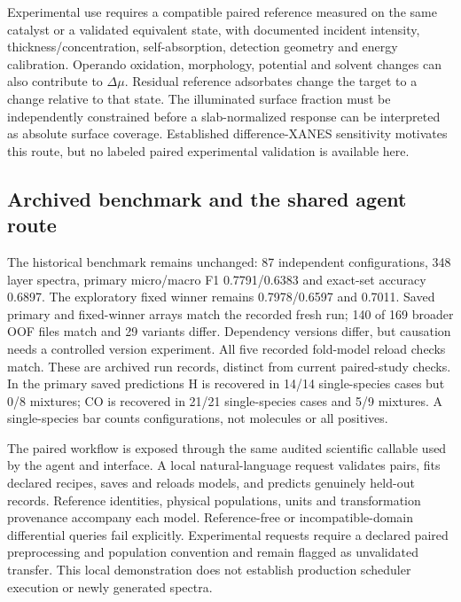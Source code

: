 \documentclass[11pt,a4paper]{article}
\begin{document}
Experimental use requires a compatible paired reference measured on the same catalyst or a validated equivalent state, with documented incident intensity, thickness/concentration, self-absorption, detection geometry and energy calibration. Operando oxidation, morphology, potential and solvent changes can also contribute to $\Delta\mu$. Residual reference adsorbates change the target to a change relative to that state. The illuminated surface fraction must be independently constrained before a slab-normalized response can be interpreted as absolute surface coverage. Established difference-XANES sensitivity motivates this route,\cite{ramaker2010,ramaker2014} but no labeled paired experimental validation is available here.

\subsection{Archived benchmark and the shared agent route}
The historical benchmark remains unchanged: 87 independent configurations, 348 layer spectra, primary micro/macro F1 0.7791/0.6383 and exact-set accuracy 0.6897. The exploratory fixed winner remains 0.7978/0.6597 and 0.7011. Saved primary and fixed-winner arrays match the recorded fresh run; 140 of 169 broader OOF files match and 29 variants differ. Dependency versions differ, but causation needs a controlled version experiment. All five recorded fold-model reload checks match. These are archived run records, distinct from current paired-study checks. In the primary saved predictions H is recovered in 14/14 single-species cases but 0/8 mixtures; CO is recovered in 21/21 single-species cases and 5/9 mixtures. A single-species bar counts configurations, not molecules or all positives.

The paired workflow is exposed through the same audited scientific callable used by the agent and interface. A local natural-language request validates pairs, fits declared recipes, saves and reloads models, and predicts genuinely held-out records. Reference identities, physical populations, units and transformation provenance accompany each model. Reference-free or incompatible-domain differential queries fail explicitly. Experimental requests require a declared paired preprocessing and population convention and remain flagged as unvalidated transfer. This local demonstration does not establish production scheduler execution or newly generated spectra.
\end{document}
